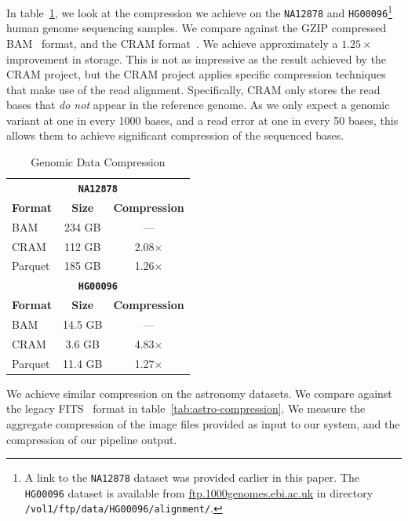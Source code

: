 \documentclass{acm_proc_article-sp}
\begin{document}
In table~\ref{tab:genomic-compression}, we look at the compression we achieve on the \texttt{NA12878}
and \texttt{HG00096}\footnote{A link to the \texttt{NA12878} dataset was provided earlier in this paper. The
\texttt{HG00096} dataset is available from \url{ftp.1000genomes.ebi.ac.uk} in directory 
\texttt{/vol1/ftp/data/HG00096/alignment/}.} human genome sequencing samples. We compare against the
GZIP compressed BAM~\cite{li09} format, and the CRAM format~\cite{fritz11}. We achieve approximately a
$1.25\times$ improvement in storage. This is not as impressive as the result achieved by the CRAM project,
but the CRAM project applies specific compression techniques that make use of the read alignment. Specifically,
CRAM only stores the read bases that \emph{do not} appear in the reference genome. As we only expect a
genomic variant at one in every 1000 bases, and a read error at one in every 50 bases, this allows them to
achieve significant compression of the sequenced bases.

\begin{table}[h]
\caption{Genomic Data Compression}
\label{tab:genomic-compression}
\begin{center}
\begin{tabular}{ l c c }
\hline
\multicolumn{3}{c}{\bf \texttt{NA12878}} \\
\bf Format & \bf Size & \bf Compression \\
\hline
\hline
BAM & 234 GB & --- \\
CRAM & 112 GB & 2.08$\times$ \\
Parquet & 185 GB & 1.26$\times$ \\
\hline
\multicolumn{3}{c}{\bf \texttt{HG00096}} \\
\bf Format & \bf Size & \bf Compression \\
\hline
\hline
BAM & 14.5 GB & --- \\
CRAM & 3.6 GB & 4.83$\times$ \\
Parquet & 11.4 GB & 1.27$\times$ \\
\hline
\end{tabular}
\end{center}
\end{table}

We achieve similar compression on the astronomy datasets. We compare against the legacy FITS~\cite{wells81}
format in table~\ref{tab:astro-compression}. We measure the aggregate compression of the image files provided
as input to our system, and the compression of our pipeline output.
\end{document}
